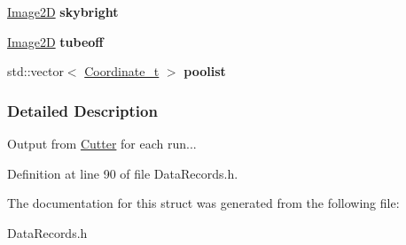 \begin{DoxyCompactItemize}
\item 
\hypertarget{structCutRecord_acf725e77a2798fc393d554cadc93ae78}{
\hyperlink{classImage2D}{Image2D} {\bfseries skybright}}
\label{structCutRecord_acf725e77a2798fc393d554cadc93ae78}

\item 
\hypertarget{structCutRecord_a1f48a29681a74f0efd706e18129f2317}{
\hyperlink{classImage2D}{Image2D} {\bfseries tubeoff}}
\label{structCutRecord_a1f48a29681a74f0efd706e18129f2317}

\item 
\hypertarget{structCutRecord_a560f83767534600d512b93522ea3ad25}{
std::vector$<$ \hyperlink{structCoordinate__t}{Coordinate\_\-t} $>$ {\bfseries poolist}}
\label{structCutRecord_a560f83767534600d512b93522ea3ad25}

\end{DoxyCompactItemize}


\subsubsection{Detailed Description}
Output from \hyperlink{classCutter}{Cutter} for each run... 

Definition at line 90 of file DataRecords.h.



The documentation for this struct was generated from the following file:\begin{DoxyCompactItemize}
\item 
DataRecords.h\end{DoxyCompactItemize}
